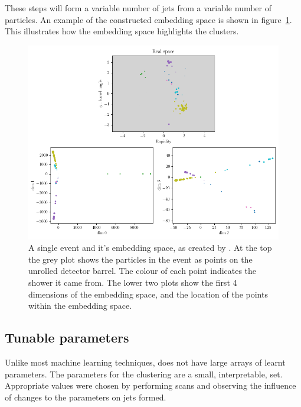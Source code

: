     These steps will form a variable number of jets from a variable number of particles.
    An example of the constructed embedding space is shown in figure~\ref{fig:embedding_space_simple}.
    This illustrates how the embedding space highlights the clusters.

    \begin{figure}[htp]
        \includegraphics[width=1\textwidth]{graphics/embedding_space_simple.png}
        \caption{A single event and it's embedding space, as created by \spectral{}.
            At the top the grey plot shows the particles in the event as points on the unrolled detector barrel.
            The colour of each point indicates the shower it came from.
            The lower two plots show the first 4 dimensions of the embedding space,
            and the location of the points within the embedding space.
        }\label{fig:embedding_space_simple}
    \end{figure}    


\subsection{Tunable parameters}\label{sec:spectralmethodparam}
Unlike most machine learning techniques, \spectral{} does not have large arrays of learnt parameters.
The parameters for the clustering are a small, interpretable, set.
Appropriate values were chosen by performing scans and observing the influence of changes to the parameters on jets formed.

